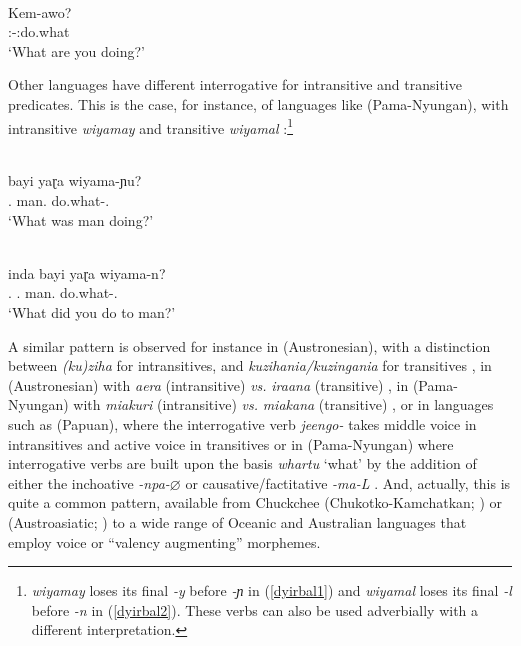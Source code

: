 \documentclass[output=paper]{langsci/langscibook}
\begin{document}
\begin{exe}
\ex \label{erro} \\
\gll Kem-awo?\\
\Ssg:\Prs-\Mr{}:do.what\\
\glt `What are you doing?'
\end{exe}


Other languages have different interrogative  for intransitive and
transitive predicates. This is the case, for instance, of languages like
 (Pama-Nyungan), with  intransitive \emph{wiyamay} and transitive
\emph{wiyamal} \citep[55]{Dixon1972}:\footnote{\emph{wiyamay} loses its final
\emph{-y} before \emph{-ɲ} in (\ref{dyirbal1}) and \emph{wiyamal}
loses its final \emph{-l} before \emph{-n} in (\ref{dyirbal2}). These verbs can
also be used adverbially with a different interpretation.}

\begin{exe}
\label{dyirbal}
\ex \label{dyirbal1} \\
\gll bayi yaɽa wiyama-ɲu?\\
\Cl.\Nom{} man.\Nom{} do.what-\Ut{}.\Intr{}\\
\glt `What was man doing?'

\ex \label{dyirbal2} \\
\gll \ng inda bayi yaɽa wiyama-n?\\
\Ssg.\Erg{} \Cl.\Nom{} man.\Nom{} do.what-\Ut{}.\Tr{}\\
\glt `What did you do to man?'
\end{exe}

A similar pattern is observed for instance in  (Austronesian), with a
distinction between \emph{(ku)ziha} for intransitives, and
\emph{kuzihania/kuzingania} for transitives \citep{vandenberg.bachet2006}, in
 (Austronesian) with \emph{aera} (intransitive) \emph{vs.}
\emph{iraana} (transitive) \parencite[82]{grovesetal1985}, in 
(Pama-Nyungan) with \emph{miakuri} (intransitive) \emph{vs.}
\emph{miakana} (transitive) \citep{blake1979}, or in languages
such as  (Papuan), where the interrogative verb \emph{jeengo-}
takes middle voice in intransitives and active voice in transitives
\citep{onishi1994} or in  (Pama-Nyungan) where interrogative
verbs are built upon the basis \emph{whartu} ‘what’  by the addition of either
the inchoative \emph{-npa-$\varnothing$} or causative/factitative \emph{-ma-L}
\citep{dench1994}. And, actually, this is quite a common pattern, available
from Chuckchee (Chukotko-Kamchatkan; \citealt{spencer1999,dunn1999})
or  (Austroasiatic; \citealt{peterson2010}) to a wide range of
Oceanic and Australian languages that employ voice or ``valency augmenting''
morphemes.\largerpage
\end{document}
